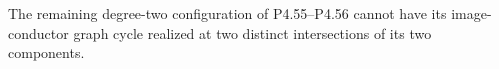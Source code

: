 
\begin{proposition}[P4.57]\hypertarget{tag-02XW}{}\label{night:P4.57}\label{stmt:P4.57}


The remaining degree-two configuration of P4.55--P4.56
cannot have its image-conductor graph cycle realized at
two distinct intersections of its two components.
\end{proposition}

